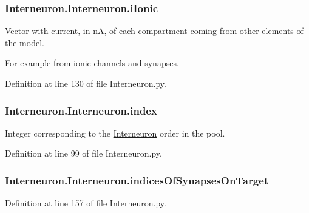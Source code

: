 \subsubsection[{\texorpdfstring{i\+Ionic}{iIonic}}]{\setlength{\rightskip}{0pt plus 5cm}Interneuron.\+Interneuron.\+i\+Ionic}\hypertarget{class_interneuron_1_1_interneuron_a3fb131eadbe0e3f7efecfb2fdc5a707b}{}\label{class_interneuron_1_1_interneuron_a3fb131eadbe0e3f7efecfb2fdc5a707b}


Vector with current, in nA, of each compartment coming from other elements of the model. 

For example from ionic channels and synapses. 

Definition at line 130 of file Interneuron.\+py.

\subsubsection[{\texorpdfstring{index}{index}}]{\setlength{\rightskip}{0pt plus 5cm}Interneuron.\+Interneuron.\+index}\hypertarget{class_interneuron_1_1_interneuron_ab8834528a49b8be56d59e0afc97019c2}{}\label{class_interneuron_1_1_interneuron_ab8834528a49b8be56d59e0afc97019c2}


Integer corresponding to the \hyperlink{class_interneuron_1_1_interneuron}{Interneuron} order in the pool. 



Definition at line 99 of file Interneuron.\+py.

\subsubsection[{\texorpdfstring{indices\+Of\+Synapses\+On\+Target}{indicesOfSynapsesOnTarget}}]{\setlength{\rightskip}{0pt plus 5cm}Interneuron.\+Interneuron.\+indices\+Of\+Synapses\+On\+Target}\hypertarget{class_interneuron_1_1_interneuron_aae8e79cf5c696fb7e7cae3e8f93db55b}{}\label{class_interneuron_1_1_interneuron_aae8e79cf5c696fb7e7cae3e8f93db55b}


Definition at line 157 of file Interneuron.\+py.

